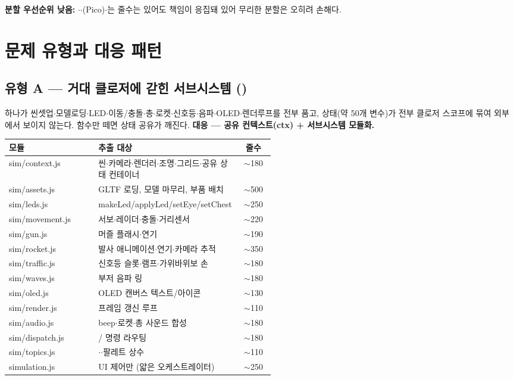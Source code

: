 \noindent\textbf{분할 우선순위 낮음:} $\cdot$$\cdot$(Pico)$\cdot$는 줄수는 있어도 책임이 응집돼 있어
무리한 분할은 오히려 손해다.

\section{문제 유형과 대응 패턴}

\subsection{유형 A --- 거대 클로저에 갇힌 서브시스템 ()}
 하나가 씬셋업$\cdot$모델로딩$\cdot$LED$\cdot$이동/충돌$\cdot$총$\cdot$로켓$\cdot$신호등$\cdot$음파$\cdot$OLED$\cdot$렌더루프를 전부 품고, 상태(약 50개 변수)가 전부
클로저 스코프에 묶여 외부에서 보이지 않는다. 함수만 떼면 상태 공유가 깨진다.
\textbf{대응 --- 공유 컨텍스트(ctx) + 서브시스템 모듈화.}

\begin{center}
\renewcommand{\arraystretch}{1.18}
\begin{tabularx}{\linewidth}{@{}>{\ttfamily\footnotesize}l L{0.52\linewidth} >{\footnotesize}c@{}}
\toprule
\sffamily 모듈 & \sffamily 추출 대상 & \sffamily 줄수 \\
\midrule
sim/context.js  & 씬$\cdot$카메라$\cdot$렌더러$\cdot$조명$\cdot$그리드$\cdot$공유 상태 컨테이너 & $\sim$180 \\
sim/assets.js   & GLTF 로딩, 모델 마무리, 부품 배치 & $\sim$500 \\
sim/leds.js     & makeLed/applyLed/setEye/setChest & $\sim$250 \\
sim/movement.js & 서보$\cdot$레이더$\cdot$충돌$\cdot$거리센서 & $\sim$220 \\
sim/gun.js      & 머즐 플래시$\cdot$연기 & $\sim$190 \\
sim/rocket.js   & 발사 애니메이션$\cdot$연기$\cdot$카메라 추적 & $\sim$350 \\
sim/traffic.js  & 신호등 슬롯$\cdot$램프$\cdot$가위바위보 손 & $\sim$180 \\
sim/waves.js    & 부저 음파 링 & $\sim$180 \\
sim/oled.js     & OLED 캔버스 텍스트/아이콘 & $\sim$130 \\
sim/render.js   & 프레임 갱신 루프 & $\sim$110 \\
sim/audio.js    & beep$\cdot$로켓$\cdot$총 사운드 합성 & $\sim$180 \\
sim/dispatch.js & / 명령 라우팅 & $\sim$180 \\
sim/topics.js   & $\cdot$$\cdot$팔레트 상수 & $\sim$110 \\
simulation.js   &  UI 제어만 (얇은 오케스트레이터) & $\sim$250 \\
\bottomrule
\end{tabularx}
\end{center}


